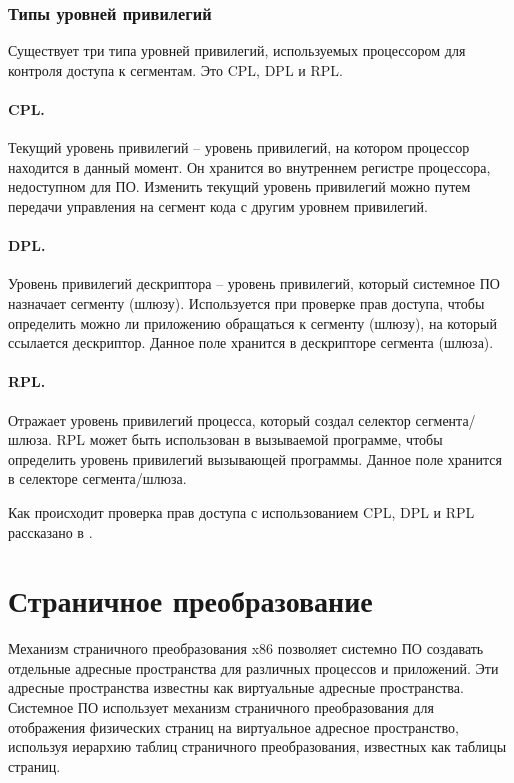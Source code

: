 \subsubsection*{Типы уровней привилегий}
Существует три типа уровней привилегий, используемых процессором для контроля доступа к сегментам.
Это CPL, DPL и RPL.

\paragraph{CPL.} Текущий уровень привилегий -- уровень привилегий, на котором процессор находится в данный
момент. Он хранится во внутреннем регистре процессора, недоступном для ПО. Изменить текущий уровень привилегий
можно путем передачи управления на сегмент кода с другим уровнем привилегий.

\paragraph{DPL.} Уровень привилегий дескриптора -- уровень привилегий, который системное ПО назначает сегменту (шлюзу).
Используется при проверке прав доступа, чтобы определить можно ли приложению обращаться к сегменту (шлюзу), на который
ссылается дескриптор. Данное поле хранится в дескрипторе сегмента (шлюза).

\paragraph{RPL.} Отражает уровень привилегий процесса, который создал селектор сегмента/шлюза. RPL может быть использован
в вызываемой программе, чтобы определить уровень привилегий вызывающей программы. Данное поле хранится
в селекторе сегмента/шлюза.

Как происходит проверка прав доступа с использованием CPL, DPL и RPL рассказано в \cite{amd_pm_v2}.

\section{Страничное преобразование}
Механизм страничного преобразования x86 позволяет системно ПО создавать отдельные адресные
пространства для различных процессов и приложений. Эти адресные пространства известны как
виртуальные адресные пространства. Системное ПО использует механизм страничного преобразования
для отображения физических страниц на виртуальное адресное пространство, используя иерархию
таблиц страничного преобразования, известных как таблицы страниц.


